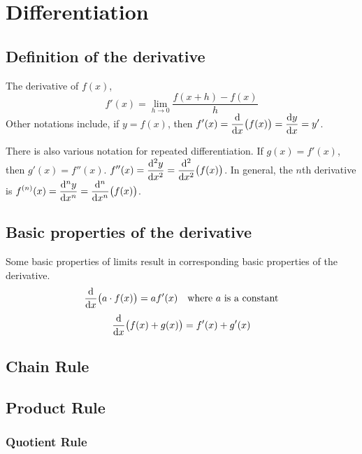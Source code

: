 \section{Differentiation}


\subsection{Definition of the derivative}

The derivative of \(f(x)\),
\begin{equation}
f'(x) = \lim_{h \to 0} \frac{f(x + h) - f(x)}{h}
\end{equation}
Other notations include, if \(y = f(x)\), then
\(\displaystyle f'(x) = \dv{x}(f(x)) = \dv{y}{x} = y'\).

There is also various notation for repeated differentiation. If
\(g(x) = f'(x)\), then \(g'(x) = f''(x)\).
\(\displaystyle f''(x) = \dv[2]{y}{x} = \dv[2]{x}(f(x))\). In general, the
\(n\)th derivative is
\(\displaystyle f^{(n)}(x) = \dv[n]{y}{x} = \dv[n]{x}(f(x))\).

\subsection{Basic properties of the derivative}
\label{sec_calc_derivative_properties}

Some basic properties of limits result in corresponding basic properties of
the derivative.
\begin{equation*}
\dv{x}(a \cdot f(x)) = af'(x) \quad \text{where \(a\) is a constant}
\end{equation*}
\begin{equation*}
\dv{x}(f(x) + g(x)) = f'(x) + g'(x)
\end{equation*}

\subsection{Chain Rule} \label{sec_calc_chain}

\subsection{Product Rule} \label{sec_calc_product}

\subsubsection{Quotient Rule} \label{sec_calc_quotient}

